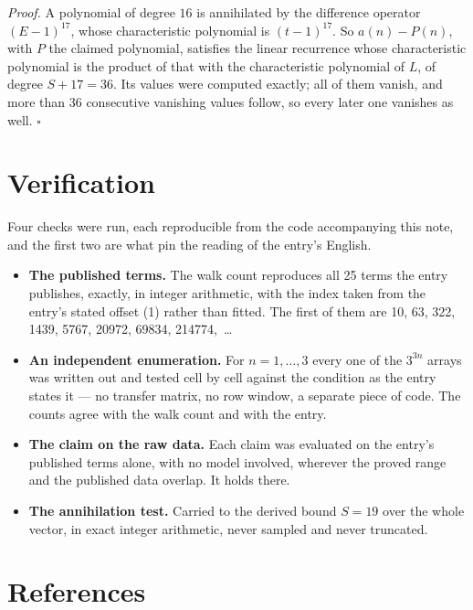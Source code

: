 \documentclass[11pt]{article}
\theoremstyle{definition}
\begin{document}
{\itshape Proof.} A polynomial of degree $16$ is annihilated by the difference operator $(E-1)^{17}$, whose characteristic polynomial is $(t-1)^{17}$. So $a(n) - P(n)$, with $P$ the claimed polynomial, satisfies the linear recurrence whose characteristic polynomial is the product of that with the characteristic polynomial of $L$, of degree $S + 17 = 36$. Its values were computed exactly; all of them vanish, and more than $36$ consecutive vanishing values follow, so every later one vanishes as well. $\square$

\section{Verification}

Four checks were run, each reproducible from the code accompanying this note, and the first two are what pin the reading of the entry's English.

\begin{itemize}

\item {\bfseries The published terms.} The walk count reproduces all 25 terms the entry publishes, exactly, in integer arithmetic, with the index taken from the entry's stated offset (1) rather than fitted. The first of them are 10, 63, 322, 1439, 5767, 20972, 69834, 214774,~\dots

\item {\bfseries An independent enumeration.} For $n = 1,\dots,3$ every one of the $3^{3n}$ arrays was written out and tested cell by cell against the condition as the entry states it --- no transfer matrix, no row window, a separate piece of code. The counts agree with the walk count and with the entry.

\item {\bfseries The claim on the raw data.} Each claim was evaluated on the entry's published terms alone, with no model involved, wherever the proved range and the published data overlap. It holds there.

\item {\bfseries The annihilation test.} Carried to the derived bound $S = 19$ over the whole vector, in exact integer arithmetic, never sampled and never truncated.

\end{itemize}

\section{References}
\end{document}
